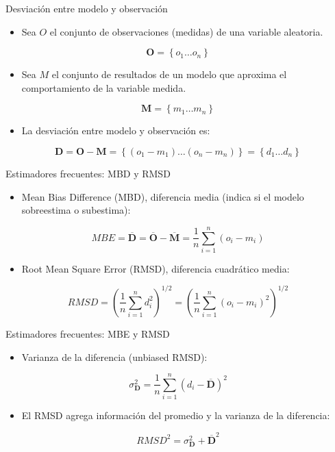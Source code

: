 \documentclass[xcolor={usenames,svgnames,dvipsnames}]{beamer}
\begin{document}
\begin{frame}[label=sec-4-1]{Desviación entre modelo y observación}
\begin{itemize}
\item Sea $O$ el conjunto de observaciones (medidas) de una variable aleatoria.
\end{itemize}

\[
\mathbf{O} = \left\{ o_1 \dots o_n \right\}
\]
\begin{itemize}
\item Sea $M$ el conjunto de resultados de un modelo que aproxima el comportamiento de la variable medida.
\end{itemize}

\[
\mathbf{M} = \left\{ m_1 \dots m_n  \right\}
\]

\begin{itemize}
\item La desviación entre modelo y observación es:
\end{itemize}

\[
\mathbf{D} = \mathbf{O} - \mathbf{M} =  \left\{ (o_1 - m_1) \dots (o_n - m_n)  \right\} = \left\{ d_1 \dots d_n  \right\}
\]
\end{frame}
\begin{frame}[label=sec-4-2]{Estimadores frecuentes: MBD y RMSD}
\begin{itemize}
\item Mean Bias Difference (MBD), diferencia media (indica si el modelo sobreestima o subestima):
\end{itemize}
\[
MBE = \overline{\mathbf{D}} = \overline{\mathbf{O}} - \overline{\mathbf{M}} = \frac{1}{n} \sum_{i=1}^n (o_i - m_i)
\]
\pause
\begin{itemize}
\item Root Mean Square Error (RMSD), diferencia cuadrático media:
\end{itemize}
\[
RMSD = \left(\frac{1}{n} \sum_{i=1}^n d_i^2 \right)^{1/2} =  \left( \frac{1}{n} \sum_{i=1}^n (o_i - m_i)^2  \right)^{1/2}
\]
\end{frame}
\begin{frame}[label=sec-4-3]{Estimadores frecuentes: MBE y RMSD}
\begin{itemize}
\item Varianza de la diferencia (unbiased RMSD):
\end{itemize}
\[
\sigma^2_{\mathbf{D}} = \frac{1}{n} \sum_{i=1}^n (d_i - \overline{\mathbf{D}})^2
\]
\pause

\begin{itemize}
\item El RMSD agrega información del promedio y la varianza de la
diferencia:
\end{itemize}
\[
RMSD^2= \sigma^2_{\mathbf{D}} + \overline{\mathbf{D}}^2
\]
\end{frame}
\end{document}
